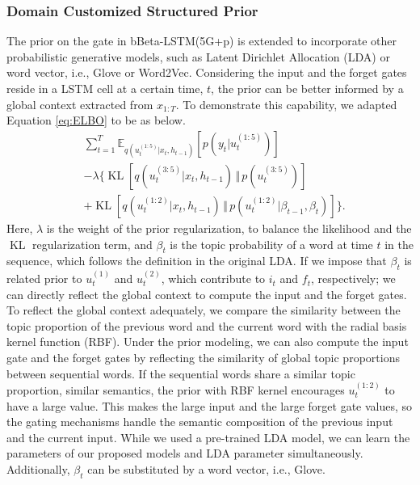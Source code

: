 \documentclass[letterpaper]{article} %
\DeclareMathOperator*{\KL}{KL}
\newcommand{\E}{\mathbb{E}}
\begin{document}
\subsubsection{Domain Customized Structured Prior}
The prior on the gate in bBeta-LSTM(5G+p) is extended to incorporate other probabilistic generative models, such as Latent Dirichlet Allocation (LDA) \cite{blei2003latent} or word vector, i.e., Glove or Word2Vec. Considering the input and the forget gates reside in a LSTM cell at a certain time, $t$, the prior can be better informed by a global context extracted from $x_{1:T}$. To demonstrate this capability, we adapted Equation \ref{eq:ELBO} to be as below.
\begin{align}
&\sum_{t=1}^{T}\E_{q(u_{t}^{(1:5)}|x_{t},h_{t-1})}[p(y_{t}|u_{t}^{(1:5)})] \nonumber \\
&- \lambda\{\KL[q(u_{t}^{(3:5)}|x_{t},h_{t-1}) \, \Vert \, p(u_{t}^{(3:5)})] \nonumber \\
&+\KL[q(u_{t}^{(1:2)}|x_{t},h_{t-1}) \, \Vert \, p(u_{t}^{(1:2)}|\beta_{t-1},\beta_{t})]\}.
\end{align}
Here, $\lambda$ is the weight of the prior regularization, to balance the likelihood and the $\KL$ regularization term, and $\beta_{t}$ is the topic probability of a word at time $t$ in the sequence, which follows the definition in the original LDA. If we impose that $\beta_{t}$ is related prior to $u_{t}^{(1)}$ and $u_{t}^{(2)}$, which contribute to $i_t$ and $f_t$, respectively; we can directly reflect the global context to compute the input and the forget gates.
To reflect the global context adequately, we compare the similarity between the topic proportion of the previous word and the current word with the radial basis kernel function (RBF).
Under the prior modeling, we can also compute the input gate and the forget gates by reflecting the similarity of global topic proportions between sequential words. If the sequential words share a similar topic proportion, similar semantics, the prior with RBF kernel encourages $u_{t}^{(1:2)}$ to have a large value. This makes the large input and the large forget gate values, so the gating mechanisms handle the semantic composition of the previous input and the current input. 
While we used a pre-trained LDA model, we can learn the parameters of our proposed models and LDA parameter simultaneously. Additionally, $\beta_{t}$ can be substituted by a word vector, i.e., Glove.
\end{document}
